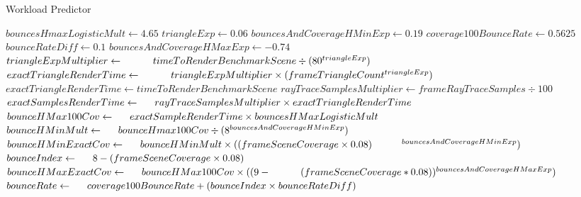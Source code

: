 ﻿\documentclass{article}
\begin{document}
    \begin{algorithm}
        \caption{Workload Predictor}\label{alg:cap}
        \begin{algorithmic}[1]
            \State $bouncesHmaxLogisticMult \gets 4.65$
            \State $triangleExp \gets 0.06$
            \State $bouncesAndCoverageHMinExp \gets 0.19$
            \State $coverage100BounceRate \gets 0.5625$
            \State $bounceRateDiff \gets 0.1$
            \State $bouncesAndCoverageHMaxExp \gets -0.74$
            \newline
                \State $triangleExpMultiplier \gets \newline \indent \indent timeToRenderBenchmarkScene \div (80 ^ {triangleExp})$
                \State $exactTriangleRenderTime \gets \newline \indent \indent triangleExpMultiplier \times (frameTriangleCount ^ {triangleExp})$
            \Else
                \State $exactTriangleRenderTime \gets timeToRenderBenchmarkScene$
            \EndIf
            \newline
            \State $rayTraceSamplesMultiplier \gets frameRayTraceSamples \div 100$
            \State $exactSamplesRenderTime \gets \newline \indent rayTraceSamplesMultiplier \times exactTriangleRenderTime$
            \newline
            \State $bounceHMax100Cov \gets \newline \indent exactSampleRenderTime \times bouncesHMaxLogisticMult$
            \State $bounceHMinMult \gets \newline \indent bounceHmax100Cov \div (8 ^ {bouncesAndCoverageHMinExp})$
            \State $bounceHMinExactCov \gets \newline \indent bounceHMinMult \times ((frameSceneCoverage \times 0.08) \newline \indent \indent ^ {bouncesAndCoverageHMinExp})$
            \State $bounceIndex \gets \newline \indent 8 - (frameSceneCoverage \times 0.08)$
            \State $bounceHMaxExactCov \gets \newline \indent bounceHMax100Cov \times ((9 - \newline \indent \indent (frameSceneCoverage * 0.08)) ^ {bouncesAndCoverageHMaxExp})$
            \State $bounceRate \gets \newline \indent coverage100BounceRate + (bounceIndex \times bounceRateDiff)$
        \end{algorithmic}
    \end{algorithm}
\end{document}
